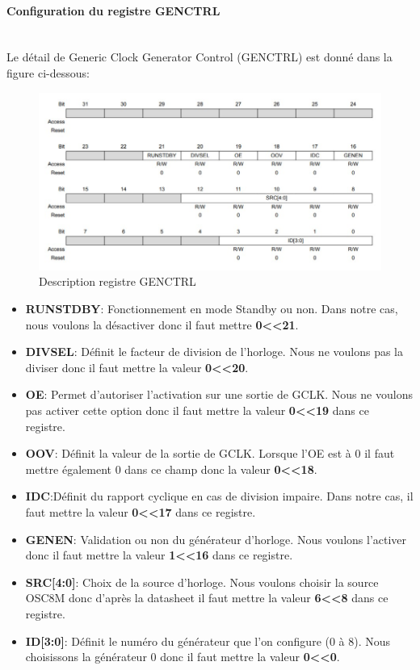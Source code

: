 \documentclass[a4paper]{article}
\begin{document}
	\newpage
	\paragraph{Configuration du registre GENCTRL} 
	~~\\
	Le détail de Generic Clock Generator Control (GENCTRL) est donné dans la figure ci-dessous:\\
	\begin{figure}[H]
		\centering
		\includegraphics[width=12cm]{GENCTRL.jpg}
		\caption{Description registre GENCTRL}
	\end{figure}
	
	\begin{itemize}
		\item {\bf RUNSTDBY}: Fonctionnement en mode Standby ou non. Dans notre cas, nous voulons la désactiver donc il faut mettre {\bf 0\textless\textless21}.~~\\
		\item {\bf DIVSEL}: Définit le facteur de division de l’horloge. Nous ne voulons pas la diviser donc il faut mettre la valeur {\bf 0\textless\textless20}.~~\\
		\item {\bf OE}: Permet d’autoriser l’activation sur une sortie de GCLK. Nous ne voulons pas activer cette option donc il faut mettre la valeur {\bf 0\textless\textless19} dans ce registre.~~\\
		\item {\bf OOV}: Définit la valeur de la sortie de GCLK. Lorsque l’OE est à 0 il faut mettre également 0 dans ce champ donc la valeur {\bf 0\textless\textless18}.~~\\
		\item {\bf IDC}:Définit du rapport cyclique en cas de division impaire. Dans notre cas, il faut mettre la valeur {\bf 0\textless\textless17} dans ce registre.~~\\
		\item {\bf GENEN}: Validation ou non du générateur d’horloge. Nous voulons l’activer donc il faut mettre la valeur {\bf 1\textless\textless16} dans ce registre.~~\\
		\item {\bf SRC[4:0]}: Choix de la source d’horloge. Nous voulons choisir la source OSC8M donc d’après la datasheet il faut mettre la valeur {\bf 6\textless\textless8} dans ce registre. ~~\\
		\item {\bf ID[3:0]}: Définit le numéro du générateur que l'on configure (0 à 8). Nous choisissons la générateur 0 donc il faut mettre la valeur {\bf 0\textless\textless0}.
	\end{itemize}
\end{document}
